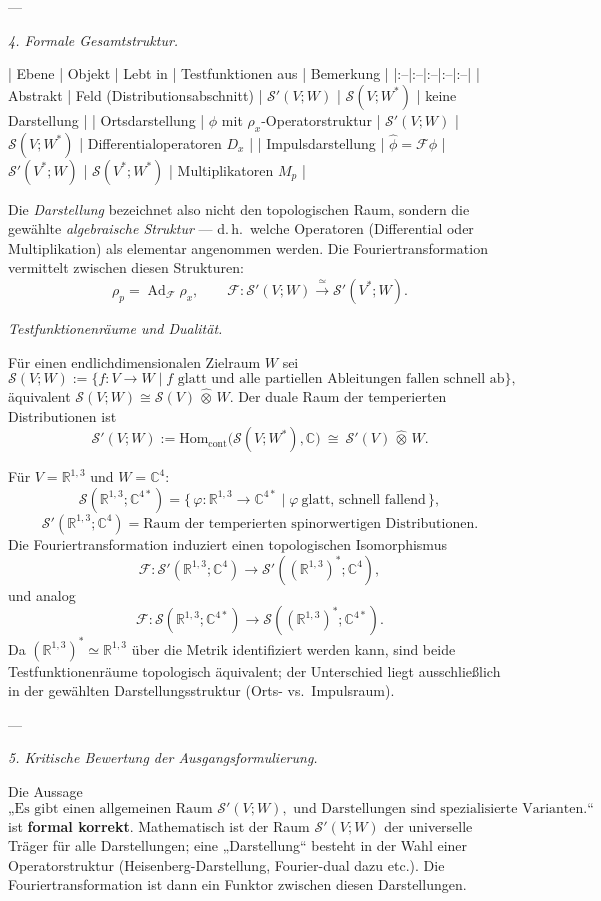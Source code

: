 \documentclass[10pt, letterpaper]{article}
\newcommand{\Ad}{\operatorname{Ad}}
\newcommand{\R}{\mathbb{R}}
\newcommand{\C}{\mathbb{C}}
\newcommand{\Hom}{\mathrm{Hom}}
\begin{document}
---

\emph{4. Formale Gesamtstruktur.}

| Ebene | Objekt | Lebt in | Testfunktionen aus | Bemerkung |
|:--|:--|:--|:--|:--|
| Abstrakt | Feld (Distributionsabschnitt) | $\mathcal{S}'(V;W)$ | $\mathcal{S}(V;W^\ast)$ | keine Darstellung |
| Ortsdarstellung | $\phi$ mit $\rho_x$-Operatorstruktur | $\mathcal{S}'(V;W)$ | $\mathcal{S}(V;W^\ast)$ | Differentialoperatoren $D_x$ |
| Impulsdarstellung | $\widehat{\phi}=\mathcal{F}\phi$ | $\mathcal{S}'(V^\ast;W)$ | $\mathcal{S}(V^\ast;W^\ast)$ | Multiplikatoren $M_p$ |

Die \emph{Darstellung} bezeichnet also nicht den topologischen Raum, sondern die gewählte
\emph{algebraische Struktur} — d.\,h.\ welche Operatoren (Differential oder Multiplikation) als elementar angenommen werden.  
Die Fouriertransformation vermittelt zwischen diesen Strukturen:
\[
\rho_p = \Ad_{\mathcal{F}}\rho_x,\qquad
\mathcal{F}:\mathcal{S}'(V;W)\xrightarrow{\ \simeq\ }\mathcal{S}'(V^\ast;W).
\]


\emph{Testfunktionenräume und Dualität.}

Für einen endlichdimensionalen Zielraum $W$ sei
\[
\mathcal{S}(V;W)
:= \{ f:V\to W \mid f \text{ glatt und alle partiellen Ableitungen fallen schnell ab}\},
\]
äquivalent $\mathcal{S}(V;W)\cong \mathcal{S}(V)\,\widehat{\otimes}\,W$.
Der duale Raum der temperierten Distributionen ist
\[
\mathcal{S}'(V;W):=\Hom_{\mathrm{cont}}\big(\mathcal{S}(V;W^\ast),\C\big)
\ \cong\ \mathcal{S}'(V)\,\widehat{\otimes}\,W.
\]

Für $V=\R^{1,3}$ und $W=\C^4$:
\[
\mathcal{S}(\R^{1,3};\C^{4\ast})
=\{\,\varphi:\R^{1,3}\to\C^{4\ast}\mid \varphi\ \text{glatt, schnell fallend}\,\},
\]
\[
\mathcal{S}'(\R^{1,3};\C^4)
=\text{Raum der temperierten spinorwertigen Distributionen}.
\]
Die Fouriertransformation induziert einen topologischen Isomorphismus
\[
\mathcal{F}:\mathcal{S}'(\R^{1,3};\C^4)
\longrightarrow
\mathcal{S}'((\R^{1,3})^\ast;\C^4),
\]
und analog
\[
\mathcal{F}:\mathcal{S}(\R^{1,3};\C^{4\ast})
\longrightarrow
\mathcal{S}((\R^{1,3})^\ast;\C^{4\ast}).
\]
Da $(\R^{1,3})^\ast\simeq\R^{1,3}$ über die Metrik identifiziert werden kann,
sind beide Testfunktionenräume topologisch äquivalent; der Unterschied liegt
ausschließlich in der gewählten Darstellungsstruktur (Orts- vs.\ Impulsraum).

---

\emph{5. Kritische Bewertung der Ausgangsformulierung.}

Die Aussage
\[
\text{„Es gibt einen allgemeinen Raum }\mathcal{S}'(V;W),\text{ und Darstellungen sind spezialisierte Varianten.“}
\]
ist \textbf{formal korrekt}.  
Mathematisch ist der Raum $\mathcal{S}'(V;W)$ der universelle Träger für alle Darstellungen;  
eine „Darstellung“ besteht in der Wahl einer Operatorstruktur (Heisenberg-Darstellung, Fourier-dual dazu etc.).
Die Fouriertransformation ist dann ein Funktor zwischen diesen Darstellungen.
\end{document}
